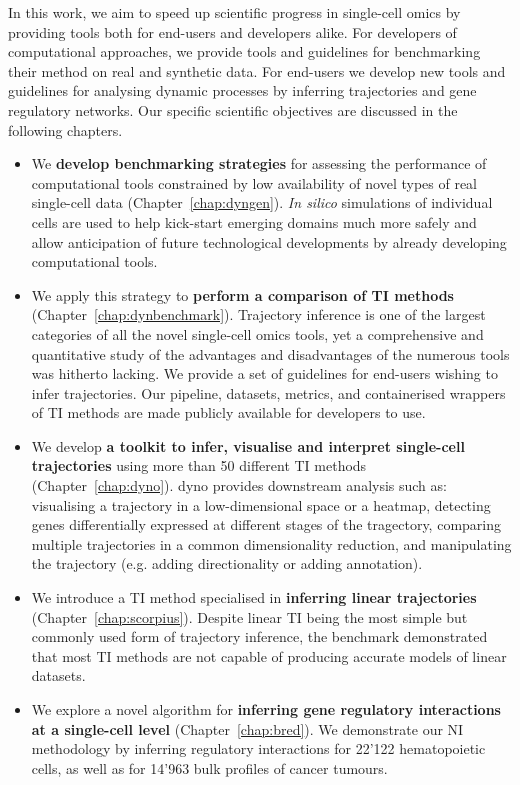 In this work, we aim to speed up scientific progress in single-cell omics by providing tools both for end-users and developers alike. For developers of computational approaches, we provide tools and guidelines for benchmarking their method on real and synthetic data. For end-users we develop new tools and guidelines for analysing dynamic processes by inferring trajectories and gene regulatory networks. Our specific scientific objectives are discussed in the following chapters.

\begin{itemize}
	\item We \textbf{develop benchmarking strategies} for assessing the performance of computational tools constrained by low availability of novel types of real single-cell data (Chapter~\ref{chap:dyngen}). \textit{In silico} simulations of individual cells are used to help kick-start emerging domains much more safely and allow anticipation of future technological developments by already developing computational tools.
	\item We apply this strategy to \textbf{perform a comparison of TI methods} (Chapter~\ref{chap:dynbenchmark}). Trajectory inference is one of the largest categories of all the novel single-cell omics tools, yet a comprehensive and quantitative study of the advantages and disadvantages of the numerous tools was hitherto lacking. We provide a set of guidelines for end-users wishing to infer trajectories. Our pipeline, datasets, metrics, and containerised wrappers of TI methods are made publicly available for developers to use.
	\item We develop \textbf{a toolkit to infer, visualise and interpret single-cell trajectories} using more than 50 different TI methods (Chapter~\ref{chap:dyno}). dyno provides downstream analysis such as: visualising a trajectory in a low-dimensional space or a heatmap, detecting genes differentially expressed at different stages of the tragectory, comparing multiple trajectories in a common dimensionality reduction, and manipulating the trajectory (e.g. adding directionality or adding annotation).
	\item We introduce a TI method specialised in \textbf{inferring linear trajectories} (Chapter~\ref{chap:scorpius}). Despite linear TI being the most simple but commonly used form of trajectory inference, the benchmark demonstrated that most TI methods are not capable of producing accurate models of linear datasets.
	\item We explore a novel algorithm for \textbf{inferring gene regulatory interactions at a single-cell level} (Chapter~\ref{chap:bred}). We demonstrate our NI methodology by inferring regulatory interactions for 22'122 hematopoietic cells, as well as for 14'963 bulk profiles of cancer tumours.

\end{itemize}
